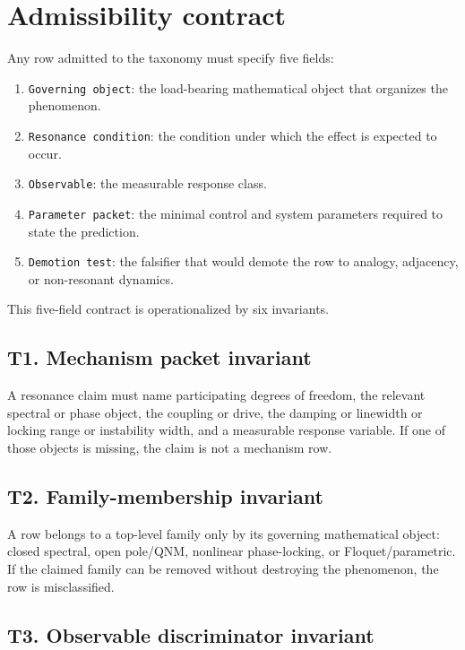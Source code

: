 \documentclass[aps,pra,reprint,nofootinbib]{revtex4-2}
\begin{document}
\section{Admissibility contract}

Any row admitted to the taxonomy must specify five fields:

\begin{enumerate}
\item \texttt{Governing object}: the load-bearing mathematical object that organizes the phenomenon.
\item \texttt{Resonance condition}: the condition under which the effect is expected to occur.
\item \texttt{Observable}: the measurable response class.
\item \texttt{Parameter packet}: the minimal control and system parameters required to state the prediction.
\item \texttt{Demotion test}: the falsifier that would demote the row to analogy, adjacency, or non-resonant dynamics.
\end{enumerate}

This five-field contract is operationalized by six invariants.

\subsection*{T1. Mechanism packet invariant}

A resonance claim must name participating degrees of freedom, the relevant spectral or phase object, the coupling or drive, the damping or linewidth or locking range or instability width, and a measurable response variable. If one of those objects is missing, the claim is not a mechanism row.

\subsection*{T2. Family-membership invariant}

A row belongs to a top-level family only by its governing mathematical object: closed spectral, open pole/QNM, nonlinear phase-locking, or Floquet/parametric. If the claimed family can be removed without destroying the phenomenon, the row is misclassified.

\subsection*{T3. Observable discriminator invariant}
\end{document}
